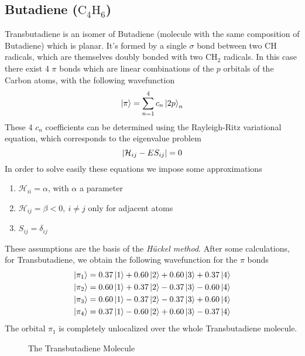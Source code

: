 \documentclass[../qm.tex]{subfiles}
\begin{document}
	\subsection{Butadiene ($\mathrm{C_4H_6}$)}
	Transbutadiene is an isomer of Butadiene (molecule with the same composition of Butadiene) which is planar. It's formed by a single $\sigma$ bond between two $\mathrm{CH}$ radicals, which are themselves doubly bonded with two $\mathrm{CH_2}$ radicals. In this case there exist 4 $\pi$ bonds which are linear combinations of the $p$ orbitals of the Carbon atoms, with the following wavefunction
	\begin{equation}
		\ket{\pi}=\sum_{n=1}^4c_n\ket{2p}_n
		\label{eq:nonlocalizedbutadiene}
	\end{equation}
	These 4 $c_n$ coefficients can be determined using the Rayleigh-Ritz variational equation, which corresponds to the eigenvalue problem
	\begin{equation*}
		\abs{\mathcal{H}_{ij}-ES_{ij}}=0
	\end{equation*}
	In order to solve easily these equations we impose some approximations
	\begin{enumerate}
	\item $\mathcal{H}_{ii}=\alpha$, with $\alpha$ a parameter
	\item $\mathcal{H}_{ij}=\beta<0,\ i\ne j$ only for adjacent atoms
	\item $S_{ij}=\delta_{ij}$
	\end{enumerate}
	These assumptions are the basis of the \textit{Hückel method}. After some calculations, for Transbutadiene, we obtain the following wavefunction for the $\pi$ bonds
	\begin{equation}
		\begin{aligned}
			\ket{\pi_1}&=0.37\ket{1}+0.60\ket{2}+0.60\ket{3}+0.37\ket{4}\\
			\ket{\pi_2}&=0.60\ket{1}+0.37\ket{2}-0.37\ket{3}-0.60\ket{4}\\
			\ket{\pi_3}&=0.60\ket{1}-0.37\ket{2}-0.37\ket{3}+0.60\ket{4}\\
			\ket{\pi_4}&=0.37\ket{1}-0.60\ket{2}+0.60\ket{3}-0.37\ket{4}
		\end{aligned}
		\label{eq:butadienewf}
	\end{equation}
	The orbital $\pi_1$ is completely unlocalized over the whole Transbutadiene molecule.
	\begin{figure}[H]
		\centering
		\caption{The Transbutadiene Molecule}
		\label{fig:transbutadiene}
	\end{figure}
\end{document}

